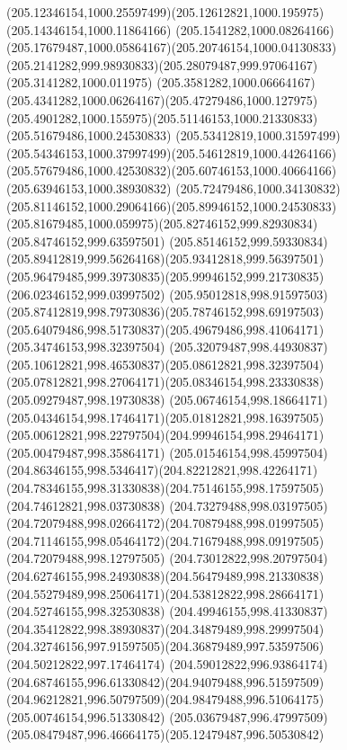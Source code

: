 {    \curveto(205.12346154,1000.25597499)(205.12612821,1000.195975)(205.14346154,1000.11864166)
    \curveto(205.1541282,1000.08264166)(205.17679487,1000.05864167)(205.20746154,1000.04130833)
    \curveto(205.2141282,999.98930833)(205.28079487,999.97064167)(205.3141282,1000.011975)
    \curveto(205.3581282,1000.06664167)(205.4341282,1000.06264167)(205.47279486,1000.127975)
    \curveto(205.4901282,1000.155975)(205.51146153,1000.21330833)(205.51679486,1000.24530833)
    \curveto(205.53412819,1000.31597499)(205.54346153,1000.37997499)(205.54612819,1000.44264166)
    \curveto(205.57679486,1000.42530832)(205.60746153,1000.40664166)(205.63946153,1000.38930832)
    \curveto(205.72479486,1000.34130832)(205.81146152,1000.29064166)(205.89946152,1000.24530833)
    \curveto(205.81679485,1000.059975)(205.82746152,999.82930834)(205.84746152,999.63597501)
    \curveto(205.85146152,999.59330834)(205.89412819,999.56264168)(205.93412818,999.56397501)
    \curveto(205.96479485,999.39730835)(205.99946152,999.21730835)(206.02346152,999.03997502)
    \curveto(205.95012818,998.91597503)(205.87412819,998.79730836)(205.78746152,998.69197503)
    \curveto(205.64079486,998.51730837)(205.49679486,998.41064171)(205.34746153,998.32397504)
    \curveto(205.32079487,998.44930837)(205.10612821,998.46530837)(205.08612821,998.32397504)
    \curveto(205.07812821,998.27064171)(205.08346154,998.23330838)(205.09279487,998.19730838)
    \curveto(205.06746154,998.18664171)(205.04346154,998.17464171)(205.01812821,998.16397505)
    \curveto(205.00612821,998.22797504)(204.99946154,998.29464171)(205.00479487,998.35864171)
    \curveto(205.01546154,998.45997504)(204.86346155,998.5346417)(204.82212821,998.42264171)
    \curveto(204.78346155,998.31330838)(204.75146155,998.17597505)(204.74612821,998.03730838)
    \curveto(204.73279488,998.03197505)(204.72079488,998.02664172)(204.70879488,998.01997505)
    \curveto(204.71146155,998.05464172)(204.71679488,998.09197505)(204.72079488,998.12797505)
    \curveto(204.73012822,998.20797504)(204.62746155,998.24930838)(204.56479489,998.21330838)
    \curveto(204.55279489,998.25064171)(204.53812822,998.28664171)(204.52746155,998.32530838)
    \curveto(204.49946155,998.41330837)(204.35412822,998.38930837)(204.34879489,998.29997504)
    \curveto(204.32746156,997.91597505)(204.36879489,997.53597506)(204.50212822,997.17464174)
    \curveto(204.59012822,996.93864174)(204.68746155,996.61330842)(204.94079488,996.51597509)
    \curveto(204.96212821,996.50797509)(204.98479488,996.51064175)(205.00746154,996.51330842)
    \curveto(205.03679487,996.47997509)(205.08479487,996.46664175)(205.12479487,996.50530842)
}
